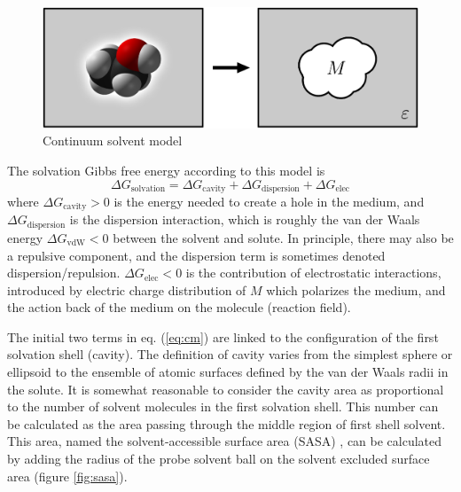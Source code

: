 \begin{figure}[h]
\begin{centering}
\includegraphics[width=0.72\columnwidth]{_figure/reaction-field-model_2}
\par\end{centering}
\caption{Continuum solvent model\label{fig:Reaction-field-model}}
\end{figure}

The solvation Gibbs free energy according to this model is
\begin{equation}
\Delta G_{\mathrm{solvation}}=\Delta G_{\mathrm{cavity}}+\Delta G_{\mathrm{dispersion}}+\Delta G_{\mathrm{elec}}\label{eq:cm}
\end{equation}
where $\Delta G_{\mathrm{cavity}}>0$ is the energy needed to create
a hole in the medium, and $\Delta G_{\mathrm{dispersion}}$ is the
dispersion interaction, which is roughly the van der Waals energy
$\Delta G_{\mathrm{vdW}}<0$ between the solvent and solute. In principle,
there may also be a repulsive component, and the dispersion term is
sometimes denoted dispersion/repulsion. $\Delta G_{\mathrm{elec}}<0$
is the contribution of electrostatic interactions, introduced by electric
charge distribution of $M$ which polarizes the medium, and the action
back of the medium on the molecule (reaction field). 

The initial two terms in eq. (\ref{eq:cm}) are linked to the configuration
of the first solvation shell (cavity). The definition of cavity varies
from the simplest sphere or ellipsoid to the ensemble of atomic surfaces
defined by the van der Waals radii in the solute. It is somewhat reasonable
to consider the cavity area as proportional to the number of solvent
molecules in the first solvation shell. This number can be calculated
as the area passing through the middle region of first shell solvent.
This area, named the solvent-accessible surface area (SASA) \citep{SAS_1,SAS_2},
can be calculated by adding the radius of the probe solvent ball on
the solvent excluded surface area (figure \ref{fig:sasa}).

